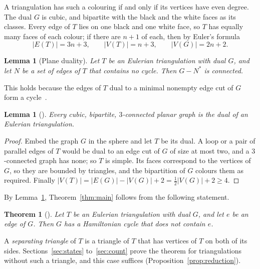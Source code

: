 \documentclass[a4paper]{amsart}
\numberwithin{equation}{section}
\newtheorem{theorem}[equation]{Theorem}
\newtheorem{lemma}[equation]{Lemma}
\theoremstyle{definition}
\begin{document}
A triangulation has such a colouring if and only if its vertices have even degree.
The dual $G$ is cubic, and bipartite with the black and the white faces as its classes.
Every edge of $T$ lies on one black and one white face, so $T$ has equally many faces of each colour; if there are $n+1$ of each, then by Euler's formula
\begin{equation}\label{eq:counts}
|E(T)|=3n+3,\qquad |V(T)|=n+3,\qquad |V(G)|=2n+2 .
\end{equation}

\begin{lemma}[Plane duality]\label{lem:duality}
Let $T$ be an Eulerian triangulation with dual $G$, and let $N$ be a set of edges of $T$ that contains no cycle.
Then $G-N^*$ is connected.
\end{lemma}

This holds because the edges of $T$ dual to a minimal nonempty edge cut of $G$ form a cycle~\cite[Proposition~4.6.1]{Diestel}.

\begin{lemma}[{\cite[Section~7]{OpenAI}}]\label{lem:dual}
Every cubic, bipartite, $3$-connected planar graph is the dual of an Eulerian triangulation.
\end{lemma}

\begin{proof}
Embed the graph $G$ in the sphere and let $T$ be its dual.
A loop or a pair of parallel edges of $T$ would be dual to an edge cut of $G$ of size at most two, and a $3$-connected graph has none; so $T$ is simple.
Its faces correspond to the vertices of $G$, so they are bounded by triangles, and the bipartition of $G$ colours them as required.
Finally $|V(T)|=|E(G)|-|V(G)|+2=\tfrac12|V(G)|+2\ge4$.
\end{proof}

By Lemma~\ref{lem:dual}, Theorem~\ref{thm:main} follows from the following statement.

\begin{theorem}[{\cite[Corollary~7.1]{OpenAI}}]\label{thm:dual}
Let $T$ be an Eulerian triangulation with dual $G$, and let $e$ be an edge of $G$.
Then $G$ has a Hamiltonian cycle that does not contain $e$.
\end{theorem}

A \emph{separating triangle} of $T$ is a triangle of $T$ that has vertices of $T$ on both of its sides.
Sections~\ref{sec:states} to~\ref{sec:count} prove the theorem for triangulations without such a triangle, and this case suffices (Proposition~\ref{prop:reduction}).
\end{document}
